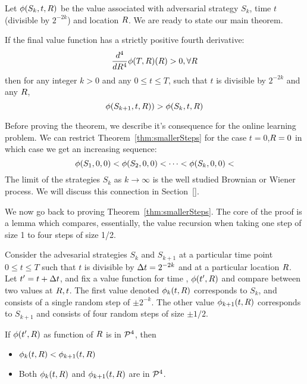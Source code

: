 \documentclass{article}[12pt]
\begin{document}
Let $\phi(S_k,t,R)$ be the value associated with adversarial
strategy $S_k$, time $t$ (divisible by $2^{-2k}$) and
location $R$. We are ready to state our main theorem.

\begin{theorem}\label{thm:smallerSteps}
  If the final value function has a strictly positive fourth
  derivative:
  $$ \frac{d^4}{d R^4} \phi(T,R)(R) >0, \forall R$$
  then for any integer $k>0$ and any $0 \leq  t \leq T$, such that $t$
  is divisible by
  $2^{-2k}$ and any $R$,
  $$\phi(S_{k+1},t,R)) >  \phi(S_{k},t,R)$$
\end{theorem}

Before proving the theorem, we describe it's
consequence for the online learning problem.
We can restrict Theorem~\ref{thm:smallerSteps} for the
case $t=0$,$R=0$ in which case we get an increasing sequence:
\[
\phi(S_1,0,0) < \phi(S_2,0,0) <\cdots <\phi(S_k,0,0) <
\]
The limit of the strategies $S_k$ as $k \to \infty$ is the well
studied Brownian or Wiener process. We will discuss this connection in Section~\ref{}.

We now go back to proving Theorem~\ref{thm:smallerSteps}. The core of
the proof is a lemma which compares, essentially, the value recursion
when taking one step of size 1 to four steps of size 1/2.


Consider the advesarial strategies $S_k$ and $S_{k+1}$ at a particular
time point $0 \leq t \leq T$ such that $t$ is divisible by
$\Delta t=2^{-2k}$ and at a particular location $R$. Let
$t'=t+\Delta t$, and fix a value
function for time , $\phi(t',R)$ and compare between
two values at $R,t$. The first value denoted
$\phi_k(t,R)$ corresponds to $S_k$, and consists of a single random step of $\pm 2^{-k}$. 
The other value $\phi_{k+1}(t,R)$ corresponds to $S_{k+1}$ and consists of
four random steps of size $\pm 1/2$.

\begin{lemma} \label{lemma:n-strictly-convex}
If $\phi(t',R)$ as function of $R$ is in ${\cal P}^{4}$, then 
\begin{itemize}
\item $\phi_k(t,R) < \phi_{k+1}(t,R)$
\item Both $\phi_k(t,R)$ and $\phi_{k+1}(t,R)$ are in ${\cal P}^{4}$.
\end{itemize}
\end{lemma}
\end{document}
